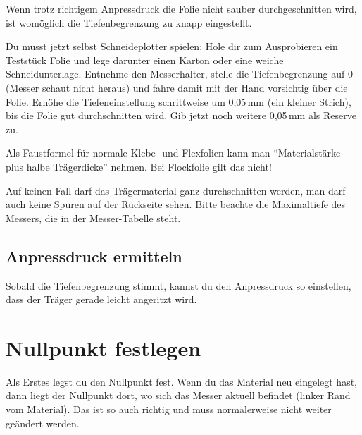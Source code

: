 \documentclass{\basedir/fablab-document}
\begin{document}
Wenn trotz richtigem Anpressdruck die Folie nicht sauber durchgeschnitten wird, ist womöglich die Tiefenbegrenzung zu knapp eingestellt. 

Du musst jetzt selbst Schneideplotter spielen:
Hole dir zum Ausprobieren ein Teststück Folie und lege darunter einen Karton oder eine weiche Schneidunterlage.
Entnehme den Messerhalter, stelle die Tiefenbegrenzung auf 0 (Messer schaut nicht heraus) und fahre damit mit der Hand vorsichtig über die Folie.
Erhöhe die Tiefeneinstellung schrittweise um 0,05\,mm (ein kleiner Strich), bis die Folie gut durchschnitten wird.
Gib jetzt noch weitere 0,05\,mm als Reserve zu.

Als Faustformel für normale Klebe- und Flexfolien kann man \enquote{Materialstärke plus halbe Trägerdicke} nehmen.
Bei Flockfolie gilt das nicht!

Auf keinen Fall darf das Trägermaterial ganz durchschnitten werden, man darf auch keine Spuren auf der Rückseite sehen.
Bitte beachte die Maximaltiefe des Messers, die in der Messer-Tabelle steht.

\subsection{Anpressdruck ermitteln}

Sobald die Tiefenbegrenzung stimmt, kannst du den Anpressdruck so einstellen,
dass der Träger gerade leicht angeritzt wird.




\section{Nullpunkt festlegen}
Als Erstes legst du den Nullpunkt fest.
Wenn du das Material neu eingelegt hast, dann liegt der Nullpunkt dort, wo sich das Messer aktuell
befindet (linker Rand vom Material).
Das ist so auch richtig und muss normalerweise nicht weiter geändert werden.
\end{document}
